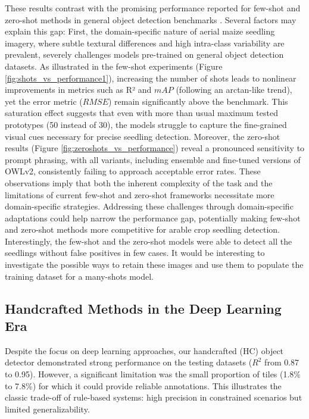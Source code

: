 \documentclass[12pt,a4paper,oneside]{report}
\begin{document}
These results contrast with the promising performance reported for few-shot and zero-shot methods 
in general object detection benchmarks \cite{xuDeViTDecomposingVision2023,mindererScalingOpenVocabularyObject2023}. 
Several factors may explain this gap: 
First, the domain-specific nature of aerial maize seedling imagery, where subtle 
textural differences and high intra-class variability are prevalent, severely challenges 
models pre-trained on general object detection datasets. As illustrated in the few-shot 
experiments (Figure \ref{fig:shots_vs_performance1}), increasing 
the number of shots leads to nonlinear improvements in metrics such as R² and $mAP$ 
(following an arctan-like trend), yet the error metric ($RMSE$) remain significantly 
above the benchmark. This saturation effect suggests that even with more than usual maximum tested
prototypes (50 instead of 30), the models struggle to capture the fine-grained visual cues 
necessary for precise seedling detection. Moreover, the zero-shot results (Figure 
\ref{fig:zeroshots_vs_performance}) reveal a pronounced sensitivity to prompt phrasing, with all 
variants, including ensemble and fine-tuned versions of OWLv2, consistently failing 
to approach acceptable error rates. These observations imply that both the inherent 
complexity of the task and the limitations of current few-shot and zero-shot frameworks 
necessitate more domain-specific strategies. Addressing these challenges through 
domain-specific adaptations could help narrow the performance gap, potentially making 
few-shot and zero-shot methods more competitive for arable crop seedling detection.
Interestingly, the few-shot and the zero-shot models were able to detect all the seedlings
without false positives in few cases. It would be interesting to investigate the
possible ways to retain these images and use them to populate the training dataset
for a many-shots model.

\subsection{Handcrafted Methods in the Deep Learning Era}
Despite the focus on deep learning approaches, our handcrafted (HC) object detector 
demonstrated strong performance on the testing datasets ($R^2$ from 0.87 to 0.95). 
However, a significant limitation was the small proportion of tiles (1.8\% to 7.8\%) 
for which it could provide reliable annotations. This illustrates the classic trade-off 
of rule-based systems: high precision in constrained scenarios but limited generalizability.
\end{document}
